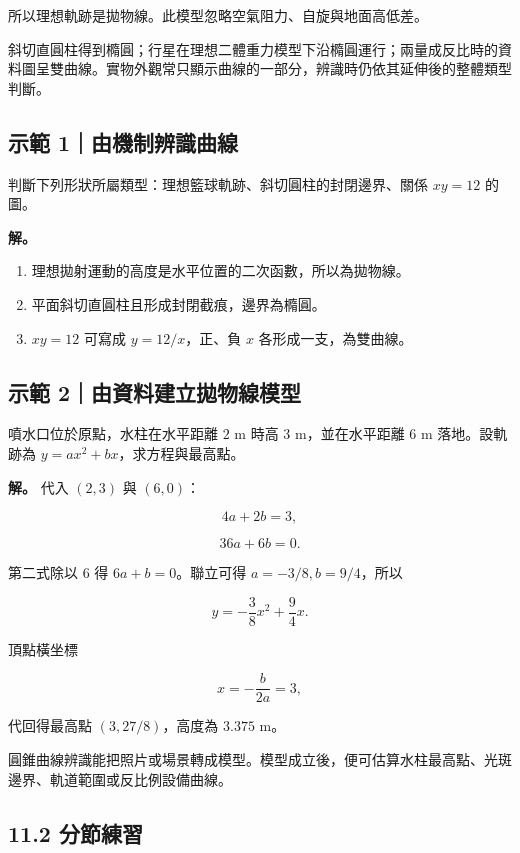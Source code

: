 \documentclass[11pt,a4paper]{article}
\providecommand{\tightlist}{%
  \setlength{\itemsep}{0pt}\setlength{\parskip}{0pt}}
\begin{document}
所以理想軌跡是拋物線。此模型忽略空氣阻力、自旋與地面高低差。

斜切直圓柱得到橢圓；行星在理想二體重力模型下沿橢圓運行；兩量成反比時的資料圖呈雙曲線。實物外觀常只顯示曲線的一部分，辨識時仍依其延伸後的整體類型判斷。

\subsection{示範 1｜由機制辨識曲線}\label{ux793aux7bc4-1ux7531ux6a5fux5236ux8fa8ux8b58ux66f2ux7dda}

判斷下列形狀所屬類型：理想籃球軌跡、斜切圓柱的封閉邊界、關係 \(xy=12\) 的圖。

\textbf{解。}

\begin{enumerate}
\def\labelenumi{\arabic{enumi}.}
\tightlist
\item
  理想拋射運動的高度是水平位置的二次函數，所以為拋物線。
\item
  平面斜切直圓柱且形成封閉截痕，邊界為橢圓。
\item
  \(xy=12\) 可寫成 \(y=12/x\)，正、負 \(x\) 各形成一支，為雙曲線。
\end{enumerate}

\subsection{示範 2｜由資料建立拋物線模型}\label{ux793aux7bc4-2ux7531ux8cc7ux6599ux5efaux7acbux62cbux7269ux7ddaux6a21ux578b}

噴水口位於原點，水柱在水平距離 \(2\text{ m}\) 時高 \(3\text{ m}\)，並在水平距離 \(6\text{ m}\) 落地。設軌跡為 \(y=ax^2+bx\)，求方程與最高點。

\textbf{解。} 代入 \((2,3)\) 與 \((6,0)\)：

\[
4a+2b=3,
\]

\[
36a+6b=0.
\]

第二式除以 \(6\) 得 \(6a+b=0\)。聯立可得 \(a=-3/8,b=9/4\)，所以

\[
y=-\frac38x^2+\frac94x.
\]

頂點橫坐標

\[
x=-\frac{b}{2a}=3,
\]

代回得最高點 \((3,27/8)\)，高度為 \(3.375\text{ m}\)。

圓錐曲線辨識能把照片或場景轉成模型。模型成立後，便可估算水柱最高點、光斑邊界、軌道範圍或反比例設備曲線。

\subsection{11.2 分節練習}\label{ux5206ux7bc0ux7df4ux7fd2-10}
\end{document}
